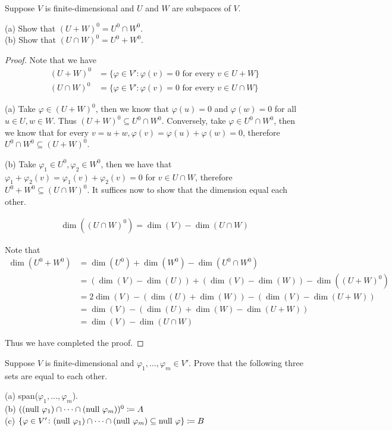 \documentclass{extarticle}
\begin{document}
\begin{problem}{22}
    Suppose \(V\) is finite-dimensional and \(U\) and \(W\) are subspaces of \(V\). 

    (a) Show that \((U + W)^0 = U^0 \cap W^0\). \\ 
    (b) Show that \((U \cap W)^0 = U^0 + W^0.\)
\end{problem}

\begin{proof}
Note that we have 
\begin{align*}
    (U + W)^0&= \{\varphi \in V' \colon \varphi(v) = 0 \text{ for every } v \in U+W\} \\ 
    (U \cap W)^0 &= \{\varphi \in V' \colon \varphi(v) = 0 \text{ for every } v \in U \cap W\}
\end{align*}

(a) Take \(\varphi \in (U+W)^0\), then we know that \(\varphi(u) = 0\) and \(\varphi(w) = 0\)
for all \(u \in U, w \in W\). Thus \((U+W)^0 \subseteq U^0 \cap W^0\). Conversely, take 
\(\varphi \in U^0 \cap W^0\), then we know that for every \(v = u + w, \varphi(v)
= \varphi(u) + \varphi(w) = 0\), therefore \(U^0 \cap W^0 \subseteq (U+W)^0\). 

(b) Take \(\varphi_1 \in U^0, \varphi_2 \in W^0\), then we have that 
\(\varphi_1 + \varphi_2 (v) = \varphi_1(v) + \varphi_2(v) = 0\) for \(v \in U \cap W\), therefore 
\(U^0 + W^0 \subseteq (U \cap W)^0\). It suffices now to show that the dimension equal each other.

\begin{align*}
    \dim ((U\cap W)^0) = \dim (V) - \dim (U \cap W)
\end{align*}

Note that 
\begin{align*}
    \dim (U^0 + W^0)
    &=\dim(U^0) + \dim (W^0) - \dim (U^0 \cap W^0) \\ 
    &= (\dim(V) - \dim(U)) + (\dim(V) - \dim(W)) - \dim ((U+W)^0) \\ 
    &= 2 \dim(V) - (\dim(U) + \dim(W)) - (\dim(V) - \dim(U+W)) \\ 
    &= \dim(V) - (\dim(U) + \dim(W) - \dim(U+W)) \\ 
    &=\dim(V) - \dim(U \cap W)
\end{align*}

Thus we have completed the proof. 
\end{proof}


\begin{problem}{23}
    Suppose \(V\) is finite-dimensional and \(\varphi_1, \ldots, \varphi_m \in V'\). Prove 
    that the following three sets are equal to each other.

    (a) span(\(\varphi_1, \ldots, \varphi_m\)). \\ 
    (b) \(((\text{null } \varphi_1) \cap \cdots \cap (\text{null } \varphi_m))^0 \coloneq A\) \\ 
    (c) \(\{\varphi \in V' \colon (\text{null } \varphi_1) \cap \cdots \cap (\text{null } \varphi_m) \subseteq \text{null } \varphi\}
    \coloneq B\) 
\end{problem}
\end{document}
